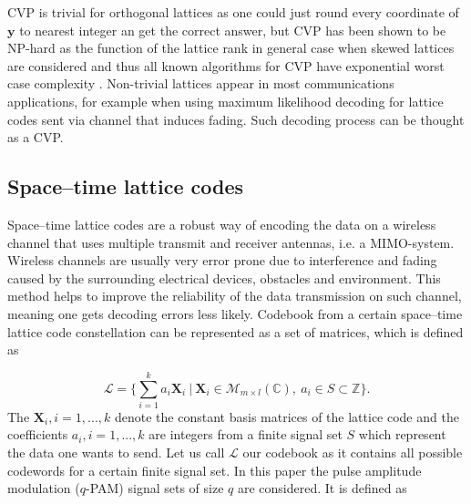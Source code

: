 \documentclass[english,12pt,a4paper,pdftex,sci,utf8]{aaltothesis}
\begin{document}
CVP is trivial for orthogonal lattices as one could just round every coordinate of $\mathbf{y}$ to nearest integer an get the correct answer, but CVP has been shown to be NP-hard as the function of the lattice rank in general case when skewed lattices are considered and thus all known algorithms for CVP have exponential worst case complexity \cite{agrell}. Non-trivial lattices appear in most communications applications, for example when using maximum likelihood decoding for lattice codes sent via channel that induces fading. Such decoding process can be thought as a CVP. %

\subsection{Space--time lattice codes}

Space--time lattice codes are a robust way of encoding the data on a  wireless channel that uses multiple transmit and receiver antennas, i.e. a MIMO-system. Wireless channels are usually very error prone due to interference and fading caused by the surrounding electrical devices, obstacles and environment. This method helps to improve the reliability of the data transmission on such channel, meaning one gets decoding errors less likely. Codebook from a certain space--time lattice code constellation can be represented as a set of matrices, which is defined as

\begin{equation}
\mathcal{L} = \Bigg\{\sum_{i=1}^k a_i\mathbf{X}_i \ \Big| \ \mathbf{X}_i \in \mathcal{M}_{m \times l}(\mathbb{C}), \ a_i \in S \subset \mathbb{Z} \Bigg\}.
\label{eq:codeword}
\end{equation}
The $\mathbf{X}_i, i = 1,...,k$ denote the constant basis matrices of the lattice code and the coefficients $a_i, i = 1,...,k$ are integers from a finite signal set $S$ which represent the data one wants to send. Let us call $\mathcal{L}$ our codebook as it contains all possible codewords for a certain finite signal set. In this paper the pulse amplitude modulation ($q$-PAM) signal sets of size $q$ are considered. It is defined as
\end{document}
